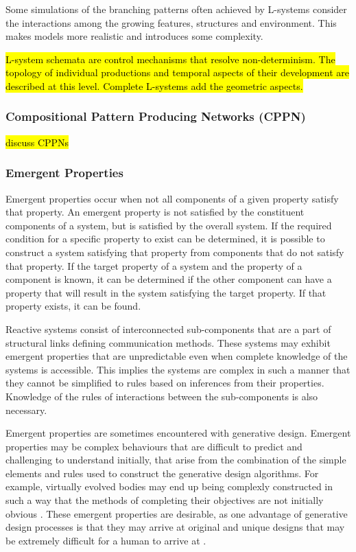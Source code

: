 Some simulations of the branching patterns often achieved by L-systems consider the interactions among the growing features, structures and environment. This makes models more realistic and introduces some complexity. \cite{Prusinkiewicz2004}

\hl{L-system schemata are control mechanisms that resolve non-determinism. The topology of individual productions and temporal aspects of their development are described at this level. Complete L-systems add the geometric aspects.} \cite{Prusinkiewicz2004}

\subsubsection{Compositional Pattern Producing Networks (CPPN)}

\hl{discuss CPPNs}

\subsubsection{Emergent Properties}

Emergent properties occur when not all components of a given property satisfy that property. An emergent property is not satisfied by the constituent components of a system, but is satisfied by the overall system. If the required condition for a specific property to exist can be determined, it is possible to construct a system satisfying that property from components that do not satisfy that property. If the target property of a system and the property of a component is known, it can be determined if the other component can have a property that will result in the system satisfying the target property. If that property exists, it can be found. \cite{Zakinthinos1998}

Reactive systems consist of interconnected sub-components that are a part of structural links defining communication methods. These systems may exhibit emergent properties that are unpredictable even when complete knowledge of the systems is accessible. This implies the systems are complex in such a manner that they cannot be simplified to rules based on inferences from their properties. Knowledge of the rules of interactions between the sub-components is also necessary. \cite{Aiguier2008}

Emergent properties are sometimes encountered with generative design. Emergent properties may be complex behaviours that are difficult to predict \cite{Aiguier2008} and challenging to understand initially, that arise from the combination of the simple elements and rules used to construct the generative design algorithms. For example, virtually evolved bodies may end up being complexly constructed in such a way that the methods of completing their objectives are not initially obvious \cite{Damper2000}. These emergent properties are desirable, as one advantage of generative design processes is that they may arrive at original and unique designs that may be extremely difficult for a human to arrive at \cite{Sims1994a}.

